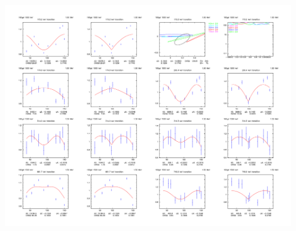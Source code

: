 \begin{center}
\includegraphics[page=6,angle=90,width=0.95\textwidth]{160Gd_15_AD_2.pdf}
\end{center}
